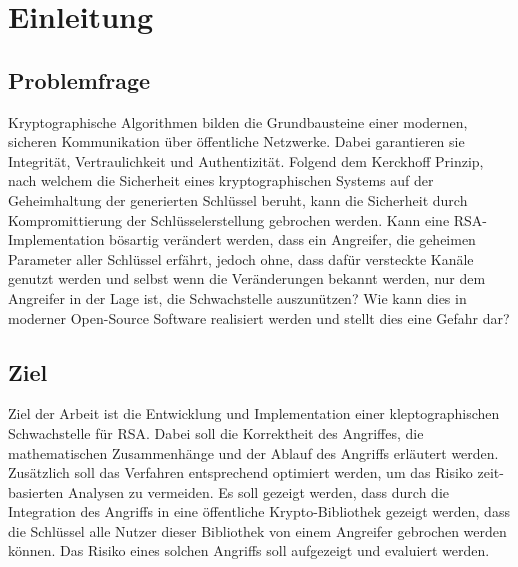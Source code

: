 \chapter{Einleitung}

    \section{Problemfrage}
        Kryptographische Algorithmen bilden die Grundbausteine einer modernen, sicheren Kommunikation über öffentliche Netzwerke. Dabei garantieren sie Integrität, Vertraulichkeit und Authentizität. Folgend dem Kerckhoff Prinzip, nach welchem die Sicherheit eines kryptographischen Systems auf der Geheimhaltung der generierten Schlüssel beruht, kann die Sicherheit durch Kompromittierung der Schlüsselerstellung gebrochen werden.
        Kann eine RSA-Implementation bösartig verändert werden, dass ein Angreifer, die geheimen Parameter aller Schlüssel erfährt, jedoch ohne, dass dafür versteckte Kanäle genutzt werden und selbst wenn die Veränderungen bekannt werden, nur dem Angreifer in der Lage ist, die Schwachstelle auszunützen?
        Wie kann dies in moderner Open-Source Software realisiert werden und stellt dies eine Gefahr dar?

    \section{Ziel}
        Ziel der Arbeit ist die Entwicklung und Implementation einer kleptographischen Schwachstelle für RSA. Dabei soll die Korrektheit des Angriffes, die mathematischen Zusammenhänge und der Ablauf des Angriffs erläutert werden. Zusätzlich soll das Verfahren entsprechend optimiert werden, um das Risiko zeit-basierten Analysen zu vermeiden. 
        Es soll gezeigt werden, dass durch die Integration des Angriffs in eine öffentliche Krypto-Bibliothek gezeigt werden, dass die Schlüssel alle Nutzer dieser Bibliothek von einem Angreifer gebrochen werden können. Das Risiko eines solchen Angriffs soll aufgezeigt und evaluiert werden. 
